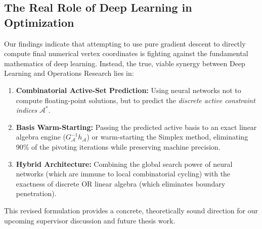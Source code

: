 \documentclass[11pt,a4paper]{article}
\begin{document}
\subsection{The Real Role of Deep Learning in Optimization}
Our findings indicate that attempting to use pure gradient descent to directly compute final numerical vertex coordinates is fighting against the fundamental mathematics of deep learning. Instead, the true, viable synergy between Deep Learning and Operations Research lies in:
\begin{enumerate}[leftmargin=1.8em, itemsep=3pt]
    \item \textbf{Combinatorial Active-Set Prediction:} Using neural networks not to compute floating-point solutions, but to predict the \textit{discrete active constraint indices} $\mathcal{A}^*$.
    \item \textbf{Basis Warm-Starting:} Passing the predicted active basis to an exact linear algebra engine ($G_{\mathcal{A}}^{-1} h_{\mathcal{A}}$) or warm-starting the Simplex method, eliminating 90\% of the pivoting iterations while preserving machine precision.
    \item \textbf{Hybrid Architecture:} Combining the global search power of neural networks (which are immune to local combinatorial cycling) with the exactness of discrete OR linear algebra (which eliminates boundary penetration).
\end{enumerate}

This revised formulation provides a concrete, theoretically sound direction for our upcoming supervisor discussion and future thesis work.
\end{document}
